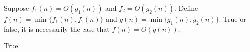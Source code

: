 \begin{prob}

    Suppose $f_1(n) = O(g_1(n))$ and $f_2 = O(g_2(n))$.
    Define $f(n) = \min \{ f_1(n), f_2(n) \}$ and $g(n) = \min \{ g_1(n), g_2(n) \}$.
    True or false, it is necessarily the case that $f(n) = O(g(n))$.

    \Tf{}

    \begin{soln}
        True.
    \end{soln}

\end{prob}
